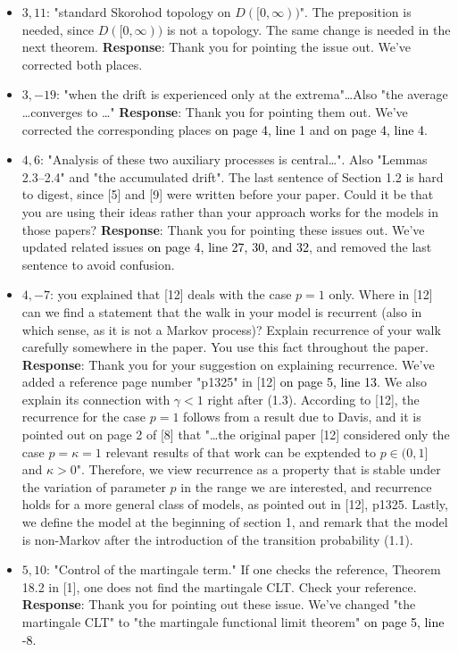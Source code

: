 \documentclass[11pt,a4paper]{article}
\numberwithin{equation}{section}
\newcommand{\PL}[2]{\textcolor{black}{on page {#1}, line {#2}}}
\begin{document}
\begin{itemize}
		
		\item 
		$3,11$: "standard Skorohod topology on $D([0,\infty))$". The preposition is needed, since $D([0,\infty))$ is not a topology. The same change is needed in the next theorem.
		\subitem \textbf{Response}: Thank you for pointing the issue out. We've corrected both places.
		
		\item 
		$3,-19$: "when the drift is experienced only at the extrema"\dots Also "the average \dots converges to \dots"
		\subitem \textbf{Response}: Thank you for pointing them out. We've corrected the  corresponding places \PL{4}{1} and \PL{4}{4}.
		
		\item 
		$4,6$: "Analysis of these two auxiliary processes is central\dots". Also "Lemmas 2.3--2.4" and "the accumulated drift". The last sentence of Section 1.2 is hard to digest, since [5] and [9] were written before your paper. Could it be that you are using their ideas rather than your approach works for the models in those papers?
		\subitem \textbf{Response}: Thank you for pointing these issues out. We've updated related issues \PL{4}{27, 30, and 32}, and removed the last sentence to avoid confusion.
		
		
		\item 
		$4,-7$: you explained that [12] deals with the case $p = 1$ only. Where in [12] can we find a statement	that the walk in your model is recurrent (also in which sense, as it is not a Markov process)? Explain recurrence of your walk carefully somewhere in the paper. You use this fact throughout the paper.
		\subitem \textbf{Response}:
		Thank you for your suggestion on explaining recurrence. We've added a reference page number "p1325" in [12] \PL{5}{13}. We also explain its connection with $\gamma<1$ right after (1.3). According to [12], the recurrence for the case $p=1$ follows from a result due to Davis, and it is pointed out on page 2 of [8] that "\dots the original paper [12] considered only the case $p=\kappa= 1$ relevant results of that work can be exptended to $p\in (0,1]$ and $\kappa>0$". Therefore, we view recurrence as a property that is stable under the variation of parameter $p$ in the range we are interested, and recurrence holds for a more general class of models, as pointed out in [12], p1325.
		Lastly, we define the model at the beginning of section 1, and remark that the model is non-Markov after the introduction of the transition probability (1.1). 
		
		
		\item 
		$5,10$: "Control of the martingale term." If one checks the reference, Theorem 18.2 in [1], one does not find the martingale CLT. Check your reference.
		\subitem \textbf{Response}:
		Thank you for pointing out these issue. We've changed "the martingale CLT" to "the martingale functional limit theorem" \PL{5}{-8}.
		

\end{itemize}
\end{document}
